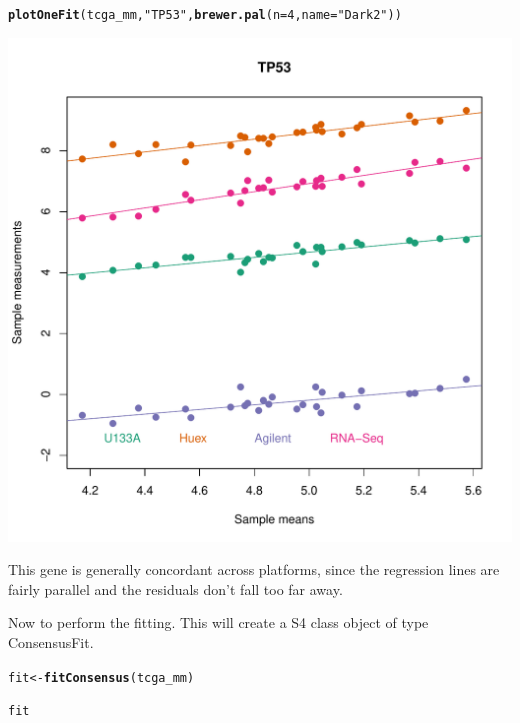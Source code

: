 \documentclass{article}\usepackage[]{graphicx}\usepackage[]{color}
\makeatletter
\def\maxwidth{ %
  \ifdim\Gin@nat@width>\linewidth
    \linewidth
  \else
    \Gin@nat@width
  \fi
}
\newcommand{\hlnum}[1]{\textcolor[rgb]{0.686,0.059,0.569}{#1}}%
\newcommand{\hlstr}[1]{\textcolor[rgb]{0.192,0.494,0.8}{#1}}%
\newcommand{\hlstd}[1]{\textcolor[rgb]{0.345,0.345,0.345}{#1}}%
\newcommand{\hlkwb}[1]{\textcolor[rgb]{0.69,0.353,0.396}{#1}}%
\newcommand{\hlkwc}[1]{\textcolor[rgb]{0.333,0.667,0.333}{#1}}%
\newcommand{\hlkwd}[1]{\textcolor[rgb]{0.737,0.353,0.396}{\textbf{#1}}}%
\newenvironment{kframe}{%
 \def\at@end@of@kframe{}%
 \ifinner\ifhmode%
  \def\at@end@of@kframe{\end{minipage}}%
  \begin{minipage}{\columnwidth}%
 \fi\fi%
 \def\FrameCommand##1{\hskip\@totalleftmargin \hskip-\fboxsep
 \colorbox{shadecolor}{##1}\hskip-\fboxsep
     \hskip-\linewidth \hskip-\@totalleftmargin \hskip\columnwidth}%
 \MakeFramed {\advance\hsize-\width
   \@totalleftmargin\z@ \linewidth\hsize
   \@setminipage}}%
 {\par\unskip\endMakeFramed%
 \at@end@of@kframe}
\newenvironment{knitrout}{}{} %
\makeatother
\begin{document}
\begin{knitrout}
\color{fgcolor}\begin{kframe}
\begin{alltt}
\hlkwd{plotOneFit}\hlstd{(tcga_mm,} \hlstr{"TP53"}\hlstd{,} \hlkwd{brewer.pal}\hlstd{(}\hlkwc{n} \hlstd{=} \hlnum{4}\hlstd{,} \hlkwc{name} \hlstd{=} \hlstr{"Dark2"}\hlstd{))}
\end{alltt}
\end{kframe}
\includegraphics[width=\maxwidth]{figure/tp53-1} 

\end{knitrout}

This gene is generally concordant across platforms, since the regression lines are fairly parallel and the residuals don't fall too far away.

Now to perform the fitting. This will create a S4 class object of type ConsensusFit.

\begin{knitrout}
\color{fgcolor}\begin{kframe}
\begin{alltt}
\hlstd{fit} \hlkwb{<-} \hlkwd{fitConsensus}\hlstd{(tcga_mm)}
\end{alltt}


{\ttfamily\noindent\bfseries{}}\begin{alltt}
\hlstd{fit}
\end{alltt}


{\ttfamily\noindent\bfseries\color{errorcolor}{\#\# Error in eval(expr, envir, enclos): object 'fit' not found}}\end{kframe}
\end{knitrout}
\end{document}
